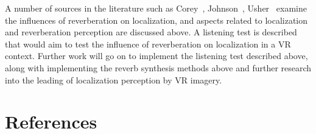 \documentclass[paper=a4, fontsize=10pt, font=arial]{scrartcl} %
\numberwithin{equation}{section} %
\numberwithin{figure}{section} %
\numberwithin{table}{section} %
\begin{document}
A number of sources in the literature such as Corey~\cite{Corey2002}, Johnson~\cite{Johnson2016}, Usher~\cite{Usher2005} examine the influences of reverberation on localization, and aspects related to localization and reverberation perception are discussed above. A listening test is described that would aim to test the influence of reverberation on localization in a VR context.
Further work will go on to implement the listening test described above, along with implementing the reverb synthesis methods above and further research into the leading of localization perception by VR imagery.

\newpage
\section{References}

{}

\end{document}
